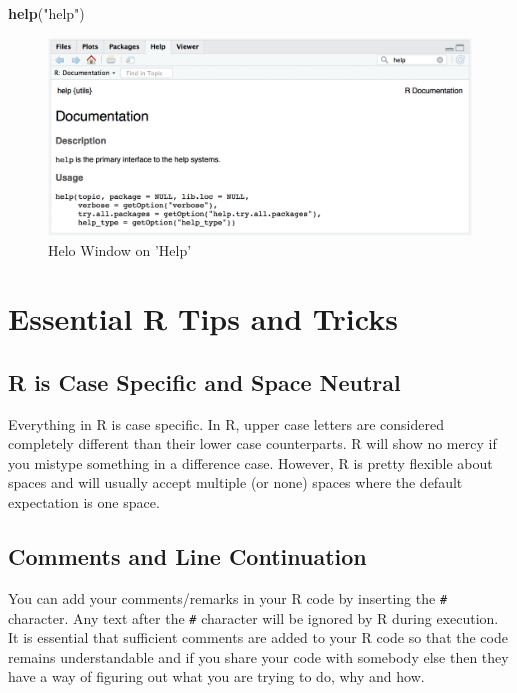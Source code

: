 \documentclass[]{krantz}
\makeatletter
\newenvironment{Shaded}{\begin{snugshade}}{\end{snugshade}}
\newcommand{\KeywordTok}[1]{\textcolor[rgb]{0.27,0.27,0.27}{\textbf{#1}}}
\newcommand{\StringTok}[1]{\textcolor[rgb]{0.5,0.5,0.5}{#1}}
\newcommand{\NormalTok}[1]{#1}
\newenvironment{kframe}{%
\medskip{}
\setlength{\fboxsep}{.8em}
 \def\at@end@of@kframe{}%
 \ifinner\ifhmode%
  \def\at@end@of@kframe{\end{minipage}}%
  \begin{minipage}{\columnwidth}%
 \fi\fi%
 \def\FrameCommand##1{\hskip\@totalleftmargin \hskip-\fboxsep
 \colorbox{shadecolor}{##1}\hskip-\fboxsep
     \hskip-\linewidth \hskip-\@totalleftmargin \hskip\columnwidth}%
 \MakeFramed {\advance\hsize-\width
   \@totalleftmargin\z@ \linewidth\hsize
   \@setminipage}}%
 {\par\unskip\endMakeFramed%
 \at@end@of@kframe}
\renewenvironment{Shaded}{\begin{kframe}}{\end{kframe}}
\makeatother
\begin{document}
\begin{Shaded}
\begin{Highlighting}[]
\KeywordTok{help}\NormalTok{(}\StringTok{"help"}\NormalTok{)}
\end{Highlighting}
\end{Shaded}

\begin{figure}

{\centering \includegraphics[width=0.8\linewidth]{images/help} 

}

\caption{Helo Window on 'Help'}\label{fig:unnamed-chunk-9}
\end{figure}

\section{Essential R Tips and Tricks}\label{essential-r-tips-and-tricks}

\subsection{R is Case Specific and Space
Neutral}\label{r-is-case-specific-and-space-neutral}

Everything in R is case specific. In R, upper case letters are
considered completely different than their lower case counterparts. R
will show no mercy if you mistype something in a difference case.
However, R is pretty flexible about spaces and will usually accept
multiple (or none) spaces where the default expectation is one space.

\subsection{Comments and Line
Continuation}\label{comments-and-line-continuation}

You can add your comments/remarks in your R code by inserting the
\texttt{\#} character. Any text after the \texttt{\#} character will be
ignored by R during execution. It is essential that sufficient comments
are added to your R code so that the code remains understandable and if
you share your code with somebody else then they have a way of figuring
out what you are trying to do, why and how.
\end{document}
